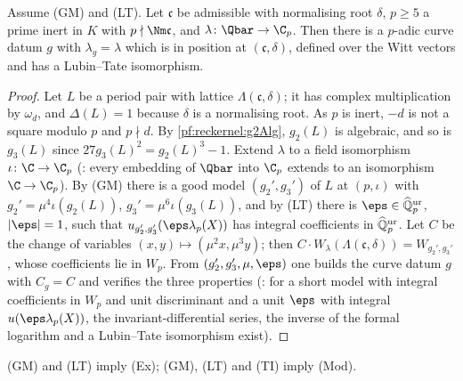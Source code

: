 \begin{lemma}\label{pf:reckernel:datumCoprime}
Assume \textup{(GM)} and \textup{(LT)}. Let $\mathfrak c$ be admissible with normalising root $\delta$, $p\ge5$ a prime
inert in $K$ with $p\nmid\Nm\mathfrak c$, and $\lambda\colon\Qbar\to\C_p$. Then there is a $p$-adic curve datum $g$ with
$\lambda_g=\lambda$ which is in position at $(\mathfrak c,\delta)$, defined over the Witt vectors and has a Lubin--Tate
isomorphism.
\end{lemma}

\begin{proof}
Let $L$ be a period pair with lattice $\Lambda(\mathfrak c,\delta)$; it has complex multiplication by $\omega_d$, and
$\Delta(L)=1$ because $\delta$ is a normalising root. As $p$ is inert, $-d$ is not a square modulo $p$ and $p\nmid d$.
By \cref{pf:reckernel:g2Alg}, $g_2(L)$ is algebraic, and so is $g_3(L)$ since $27g_3(L)^2=g_2(L)^3-1$. Extend
$\lambda$ to a field isomorphism $\iota\colon\C\to\C_p$
(: every embedding of $\Qbar$ into $\C_p$ extends
to an isomorphism $\C\to\C_p$). By \textup{(GM)} there is a good model $(g_2',g_3')$ of $L$ at $(p,\iota)$ with
$g_2'=\mu^4\iota(g_2(L))$, $g_3'=\mu^6\iota(g_3(L))$, and by \textup{(LT)} there is $\eps\in\reckKurp$, $|\eps|=1$, such
that $u_{g_2',g_3'}(\eps\lambda_p(X))$ has integral coefficients in $\widehat{\mathbb{Q}}{}_p^{\mathrm{ur}}$. Let $C$ be the change of variables
$(x,y)\mapsto(\mu^2x,\mu^3y)$; then $C\cdot W_\lambda(\Lambda(\mathfrak c,\delta))=W_{g_2',g_3'}$, whose coefficients lie in
$W_p$. From $(g_2',g_3',\mu,\eps)$ one builds the curve datum $g$ with $C_g=C$ and verifies the three properties
(: for a short model with integral coefficients in $W_p$ and unit
discriminant and a unit $\eps$ with integral $u(\eps\lambda_p(X))$, the invariant-differential series, the inverse of
the formal logarithm and a Lubin--Tate isomorphism exist).
\end{proof}

\begin{theorem}\label{pf:reckernel:modEx}
\textup{(GM)} and \textup{(LT)} imply \textup{(Ex)}; \textup{(GM)}, \textup{(LT)} and \textup{(TI)} imply \textup{(Mod)}.
\end{theorem}

